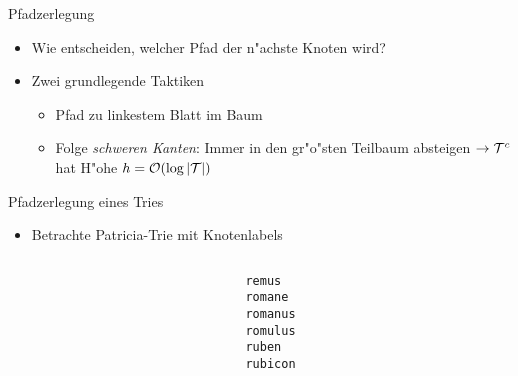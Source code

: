 \documentclass[ngerman,hyperref={pdfpagelabels=true}]{beamer}
\begin{document}
\begin{frame}{Pfadzerlegung}
\begin{itemize}
\item Wie entscheiden, welcher Pfad der n"achste Knoten wird?
\item Zwei grundlegende Taktiken
\begin{itemize}
\item Pfad zu linkestem Blatt im Baum
\item Folge \emph{schweren Kanten}: Immer in den gr"o"sten Teilbaum absteigen
$\rightarrow \mathcal{T}^c$ hat H"ohe $h = \mathcal{O}(\log |\mathcal{T}|)$
\end{itemize}
\end{itemize}
\end{frame}

\newcommand{\edgelabel}[2]{edge from parent node[draw=none,#1]{\lstinline|#2|}}

\begin{frame}{Pfadzerlegung eines Tries}
\begin{itemize}
\item Betrachte Patricia-Trie mit Knotenlabels
\end{itemize}

\begin{columns}[T] %
\begin{column}{.48\textwidth}

\centering


\end{column}%
\hfill%
\begin{column}{.48\textwidth}



\lstinline|remus| \\
\lstinline|romane| \\
\lstinline|romanus| \\
\lstinline|romulus| \\
\lstinline|ruben| \\
\lstinline|rubicon| \\

\end{column}
\end{columns}

\end{frame}
\end{document}
